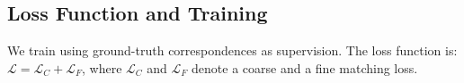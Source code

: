 \subsection{Loss Function and Training}
We train \ourmethod using ground-truth correspondences as supervision. 
The loss function is: $\mathcal{L} = \mathcal{L}_{C}  + \mathcal{L}_{F}$,
where $\mathcal{L}_{C}$ and $\mathcal{L}_{F}$ denote a coarse and a fine matching loss.



